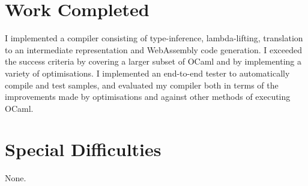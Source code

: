 \documentclass[12pt,notitlepage]{report}
\newcommand\note[1]{}
\begin{document}
\section*{Work Completed}
I implemented a compiler consisting of type-inference, lambda-lifting, translation to an intermediate representation and WebAssembly code generation. I exceeded the success criteria by covering a larger subset of OCaml and by implementing a variety of optimisations. I implemented an end-to-end tester to automatically compile and test samples, and evaluated my compiler both in terms of the improvements made by optimisations and against other methods of executing OCaml.


\section*{Special Difficulties}

None.

\tableofcontents

\listoffigures


\clearpage        %

\setcounter{page}{1}
\pagestyle{headings}


\clearpage


\clearpage


\clearpage


\clearpage


\clearpage


\printbibliography[title={Bibliography}]
\clearpage

\appendix
\end{document}
